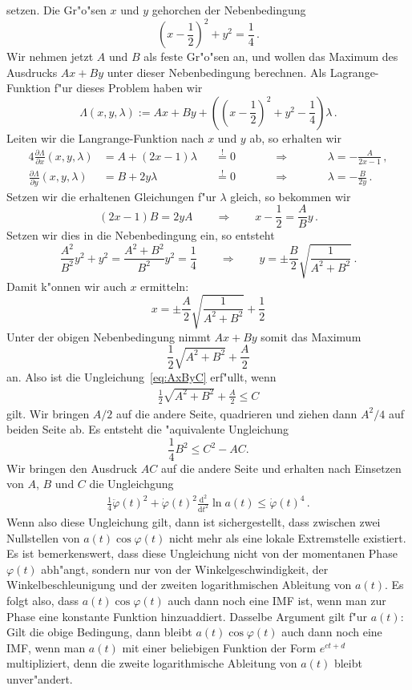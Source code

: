 \documentclass[a4paper]{scrartcl}
\newcommand{\de}{{\mathrm{d}}}
\newcommand{\pphi}{{\varphi}}
\newcommand{\defeq}{\overset{!}{=}}
\begin{document}
setzen. Die Gr"o"sen $x$ und $y$ gehorchen der Nebenbedingung
$$ \left(x-\frac12\right)^2 + y^2 = \frac14\,. $$
Wir nehmen jetzt $A$ und $B$ als feste Gr"o"sen an, und wollen das Maximum des Ausdrucks $Ax+By$ unter dieser Nebenbedingung berechnen. 
Als Lagrange-Funktion f"ur dieses Problem haben wir
$$ \Lambda(x,y,\lambda) 
:= Ax + By + \left( \left(x-\frac12\right)^2 + y^2 - \frac14 \right) \lambda \,. $$
Leiten wir die Langrange-Funktion nach $x$ und $y$ ab, so erhalten wir
\begin{alignat*}{4}
  \frac{\partial\Lambda}{\partial x}(x,y,\lambda) &= A + (2x-1)\lambda &&\defeq 0 
  &\qquad&\Longrightarrow &\qquad& \lambda = -\frac{A}{2x-1}\,, \\
  \frac{\partial\Lambda}{\partial y}(x,y,\lambda) &= B +  2y   \lambda &&\defeq 0 
  && \Longrightarrow && \lambda = -\frac{B}{2y}\,.
\end{alignat*}
Setzen wir die erhaltenen Gleichungen f"ur $\lambda$ gleich, so bekommen wir 
$$ (2x-1)B = 2yA \qquad \Longrightarrow \qquad
x-\frac12 = \frac AB y\,. $$
Setzen wir dies in die Nebenbedingung ein, so entsteht
$$ \frac{A^2}{B^2}y^2 + y^2 = \frac{A^2+B^2}{B^2}y^2 
= \frac14 \qquad \Longrightarrow \qquad
y=\pm\frac B2\sqrt{\frac{1}{A^2+B^2}}\,. $$
Damit k"onnen wir auch $x$ ermitteln:
$$ x = \pm\frac A2\sqrt{\frac{1}{A^2+B^2}} + \frac12 $$
Unter der obigen Nebenbedingung nimmt $Ax+By$ somit das Maximum
$$ \frac12 \sqrt{A^2+B^2}+\frac A2 $$
an. Also ist die Ungleichung~\eqref{eq:AxByC} erf"ullt, wenn 
\begin{align} \label{eq:intermediateABC}
  \frac12\sqrt{A^2+B^2}+\frac A2 \le C 
\end{align}
gilt. Wir bringen $A/2$ auf die andere Seite, quadrieren und ziehen dann $A^2/4$ auf beiden Seite ab. 
Es entsteht die "aquivalente Ungleichung
$$ \frac14 B^2 \le C^2 - AC. $$
Wir bringen den Ausdruck $AC$ auf die andere Seite und erhalten nach Einsetzen von $A$, $B$ und $C$ die Ungleichgung
\begin{align} \label{eq:condpphiiai}
  \frac14\ddot\pphi(t)^2 + \dot\pphi(t)^2\frac{\de^2}{\de t^2}\ln a(t) 
  \le \dot\pphi(t)^4\,.
\end{align}
Wenn also diese Ungleichung gilt, dann ist sichergestellt, dass zwischen zwei Nullstellen von $a(t)\cos\pphi(t)$ nicht mehr als eine lokale Extremstelle existiert. 
Es ist bemerkenswert, dass diese Ungleichung nicht von der momentanen Phase $\pphi(t)$ abh"angt, sondern nur von der Winkelgeschwindigkeit, der Winkelbeschleunigung und der zweiten logarithmischen Ableitung von $a(t)$. 
Es folgt also, dass $a(t)\cos\pphi(t)$ auch dann noch eine IMF ist, wenn man zur Phase eine konstante Funktion hinzuaddiert. 
Dasselbe Argument gilt f"ur $a(t)$: Gilt die obige Bedingung, dann bleibt $a(t)\cos\pphi(t)$ auch dann noch eine IMF, wenn man  $a(t)$ mit einer beliebigen Funktion der Form $e^{ct+d}$ multipliziert, denn die zweite logarithmische Ableitung von $a(t)$ bleibt unver"andert. 
\end{document}
